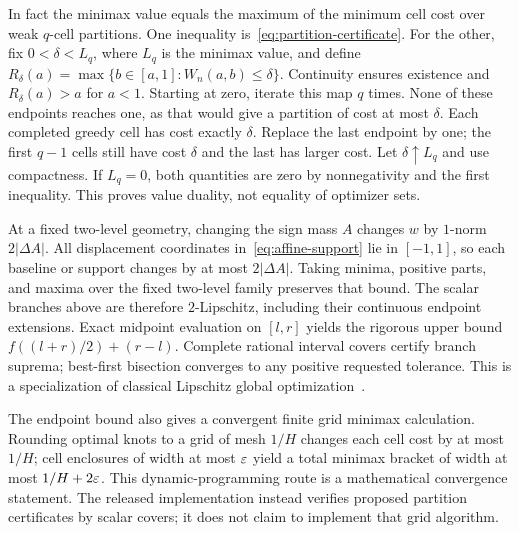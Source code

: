 In fact the minimax value equals the maximum of the minimum cell cost over weak $q$-cell partitions. One inequality is~\eqref{eq:partition-certificate}. For the other, fix $0<\delta<L_q$, where $L_q$ is the minimax value, and define
$R_\delta(a)=\max\{b\in[a,1]:W_n(a,b)\le\delta\}$.
Continuity ensures existence and $R_\delta(a)>a$ for $a<1$. Starting at zero, iterate this map $q$ times. None of these endpoints reaches one, as that would give a partition of cost at most $\delta$. Each completed greedy cell has cost exactly $\delta$. Replace the last endpoint by one; the first $q-1$ cells still have cost $\delta$ and the last has larger cost. Let $\delta\uparrow L_q$ and use compactness. If $L_q=0$, both quantities are zero by nonnegativity and the first inequality. This proves value duality, not equality of optimizer sets.

At a fixed two-level geometry, changing the sign mass $A$ changes $w$ by $1$-norm $2|\Delta A|$. All displacement coordinates in~\eqref{eq:affine-support} lie in $[-1,1]$, so each baseline or support changes by at most $2|\Delta A|$. Taking minima, positive parts, and maxima over the fixed two-level family preserves that bound. The scalar branches above are therefore $2$-Lipschitz, including their continuous endpoint extensions. Exact midpoint evaluation on $[l,r]$ yields the rigorous upper bound $f((l+r)/2)+(r-l)$. Complete rational interval covers certify branch suprema; best-first bisection converges to any positive requested tolerance. This is a specialization of classical Lipschitz global optimization~\cite{shubert1972}.

The endpoint bound also gives a convergent finite grid minimax calculation. Rounding optimal knots to a grid of mesh $1/H$ changes each cell cost by at most $1/H$; cell enclosures of width at most $\varepsilon$ yield a total minimax bracket of width at most $1/H+2\varepsilon$. This dynamic-programming route is a mathematical convergence statement. The released implementation instead verifies proposed partition certificates by scalar covers; it does not claim to implement that grid algorithm.
